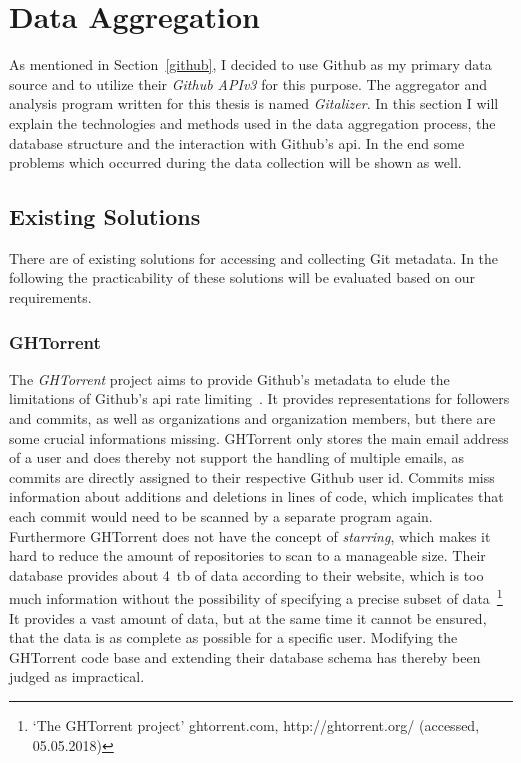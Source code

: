 \section{Data Aggregation}\label{aggregator}
As mentioned in Section~\ref{github}, I decided to use Github as my primary data source and to utilize their \emph{Github APIv3} for this purpose.
The aggregator and analysis program written for this thesis is named \emph{Gitalizer}.
In this section I will explain the technologies and methods used in the data aggregation process, the database structure and the interaction with Github's \ac{api}.
In the end some problems which occurred during the data collection will be shown as well.


\subsection{Existing Solutions}
There are of existing solutions for accessing and collecting Git metadata.
In the following the practicability of these solutions will be evaluated based on our requirements.

\subsubsection{GHTorrent}
The \emph{GHTorrent} project aims to provide Github's metadata to elude the limitations of Github's \ac{api} rate limiting~\cite{inproceedings:ghtorrent}.
It provides representations for followers and commits, as well as organizations and organization members, but there are some crucial informations missing.
GHTorrent only stores the main email address of a user and does thereby not support the handling of multiple emails, as commits are directly assigned to their respective Github user id.
Commits miss information about additions and deletions in lines of code, which implicates that each commit would need to be scanned by a separate program again.
Furthermore GHTorrent does not have the concept of \emph{starring}, which makes it hard to reduce the amount of repositories to scan to a manageable size.
Their database provides about 4~\ac{tb} of data according to their website, which is too much information without the possibility of specifying a precise subset of data~\footnote{`The GHTorrent project' ghtorrent.com, http://ghtorrent.org/ (accessed, 05.05.2018)}
It provides a vast amount of data, but at the same time it cannot be ensured, that the data is as complete as possible for a specific user.
Modifying the GHTorrent code base and extending their database schema has thereby been judged as impractical.

